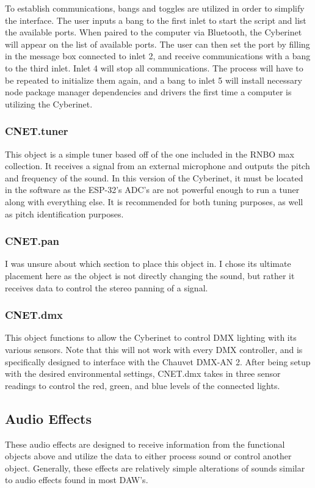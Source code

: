 To establish communications, bangs and toggles are utilized in order to simplify the interface. The user inputs a bang to the first inlet to start the script and list the available ports. When paired to the computer via Bluetooth, the Cyberinet will appear on the list of available ports. The user can then set the port by filling in the message box connected to inlet 2, and receive communications with a bang to the third inlet. Inlet 4 will stop all communications. The process will have to be repeated to initialize them again, and a bang to inlet 5 will install necessary node package manager dependencies and drivers the first time a computer is utilizing the Cyberinet.


\subsubsection{CNET.tuner}

This object is a simple tuner based off of the one included in the RNBO max collection. It receives a signal from an external microphone and outputs the pitch and frequency of the sound. In this version of the Cyberinet, it must be located in the software as the ESP-32's ADC's are not powerful enough to run a tuner along with everything else. It is recommended for both tuning purposes, as well as pitch identification purposes. 

\subsubsection{CNET.pan}
I was unsure about which section to place this object in. I chose its ultimate placement here as the object is not directly changing the sound, but rather it receives data to control the stereo panning of a signal.

\subsubsection{CNET.dmx}
This object functions to allow the Cyberinet to control DMX lighting with its various sensors. Note that this will not work with every DMX controller, and is specifically designed to interface with the Chauvet DMX-AN 2. After being setup with the desired environmental settings, CNET.dmx takes in three sensor readings to control the red, green, and blue levels of the connected lights.

\subsection{Audio Effects}
These audio effects are designed to receive information from the functional objects above and utilize the data to either process sound or control another object. Generally, these effects are relatively simple alterations of sounds similar to audio effects found in most DAW's.

